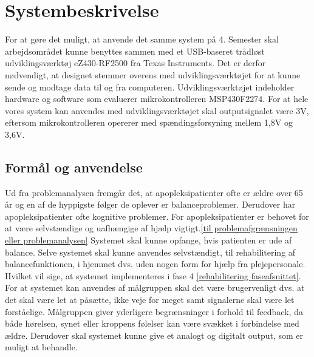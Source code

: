 \section{Systembeskrivelse}
For at gøre det muligt, at anvende det samme system på 4. Semester skal arbejdsområdet kunne benyttes sammen med et USB-baseret trådløst udviklingsværktøj eZ430-RF2500 fra Texas Instruments. Det er derfor nødvendigt, at designet stemmer overens med udviklingsværktøjet for at kunne sende og modtage data til og fra computeren. Udviklingsværktøjet indeholder hardware og software som evaluerer mikrokontrolleren MSP430F2274. For at hele vores system kan anvendes med udviklingsværktøjet skal outputsignalet være 3V, eftersom mikrokontrolleren opererer med spændingsforsyning mellem 1,8V og 3,6V.  

\subsection{Formål og anvendelse}
Ud fra problemanalysen fremgår det, at apopleksipatienter ofte er ældre over 65 år og en af de hyppigste følger de oplever er balanceproblemer. Derudover har apopleksipatienter ofte kognitive problemer. For apopleksipatienter er behovet for at være selvstændige og uafhængige af hjælp vigtigt.\ref{til problemafgrænsningen eller problemanalysen}  
Systemet skal kunne opfange, hvis patienten er ude af balance. Selve systemet skal kunne anvendes selvstændigt, til rehabilitering af balancefunktionen, i hjemmet dvs. uden nogen form for hjælp fra plejepersonale. Hvilket vil sige, at systemet implementeres i fase 4 \ref{rehabilitering faseafsnittet}. For at systemet kan anvendes af målgruppen skal det være brugervenligt dvs. at det skal være let at påsætte, ikke veje for meget samt signalerne skal være let forståelige. Målgruppen giver yderligere begrænsninger i forhold til feedback, da både hørelsen, synet eller kroppens følelser kan være svækket i forbindelse med ældre. Derudover skal systemet kunne give et analogt og digitalt output, som er muligt at behandle.


